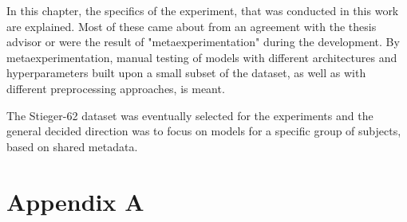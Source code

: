 \documentclass[english, he, bc, kiv, iso690alph]{fasthesis}
\begin{document}
In this chapter, the specifics of the experiment, that was conducted in this work are explained. Most of these came about from an agreement with the thesis advisor or were the result of "metaexperimentation" during the development. By metaexperimentation, manual testing of models with different architectures and hyperparameters built upon a small subset of the dataset, as well as with different preprocessing approaches, is meant.

The Stieger-62 dataset was eventually selected for the experiments and the general decided direction was to focus on models for a specific group of subjects, based on shared metadata.

\appendix
\chapter{Appendix A}

\backmatter
\printbibliography
\backpage
\end{document}
